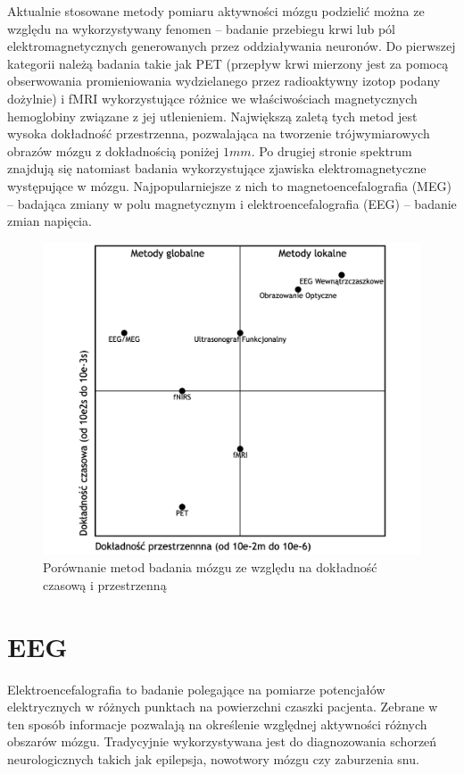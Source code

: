\documentclass{./assets/wfis}
\begin{document}
Aktualnie stosowane metody pomiaru aktywności mózgu podzielić można ze względu na wykorzystywany fenomen – badanie przebiegu krwi lub pól elektromagnetycznych generowanych przez oddziaływania neuronów. Do pierwszej kategorii należą badania takie jak PET (przepływ krwi mierzony jest za pomocą obserwowania promieniowania wydzielanego przez radioaktywny izotop podany dożylnie) i fMRI wykorzystujące różnice we właściwościach magnetycznych hemoglobiny związane z jej utlenieniem. Największą zaletą tych metod jest wysoka dokładność przestrzenna, pozwalająca na tworzenie trójwymiarowych obrazów mózgu z dokładnością poniżej $1mm$. Po drugiej stronie  spektrum znajdują się natomiast badania wykorzystujące zjawiska elektromagnetyczne występujące w mózgu. Najpopularniejsze z nich to magnetoencefalografia (MEG) – badająca zmiany w polu magnetycznym i elektroencefalografia (EEG) – badanie zmian napięcia. 

\begin{figure}[h]
    \centering
    \includegraphics[width=0.5\columnwidth]{thesis/assets/brain_imaging_comparasion.png}
    \caption{Porównanie metod badania mózgu ze względu na dokładność czasową i przestrzenną}
    \label{fig:brain-imaging-comparasion}
\end{figure}

\section{EEG}
Elektroencefalografia to badanie polegające na pomiarze potencjałów elektrycznych w różnych punktach na powierzchni czaszki pacjenta. Zebrane w ten sposób informacje pozwalają na określenie względnej aktywności różnych obszarów mózgu. Tradycyjnie wykorzystywana jest do diagnozowania schorzeń neurologicznych takich jak epilepsja, nowotwory mózgu czy zaburzenia snu.
\end{document}
